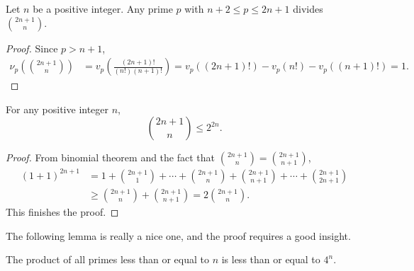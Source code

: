 \documentclass{subfile}
\begin{document}
	\begin{lemma}\label{lem:bertrand4}
		Let $n$ be a positive integer. Any prime $p$ with $n+2\leq p\leq 2n+1$ divides $\binom{2n+1}{n}$.
	\end{lemma}

	\begin{proof}
		Since $p>n+1$,
		\begin{align*}
			\nu_p\left(\binom{2n+1}{n}\right)  & =  v_p \left(\frac{(2n+1)!}{(n!)(n+1)!}\right) = v_p((2n+1)!)-v_p(n!)-v_p((n+1)!)=1.
		\end{align*}
	\end{proof}

	\begin{lemma}\label{lem:bertrand5}
		For any positive integer $n$,
		\[\binom{2n+1}{n}\leq2^{2n}.\]
	\end{lemma}

	\begin{proof}
		From binomial theorem and the fact that $\binom{2n+1}{n}=\binom{2n+1}{n+1}$,
		\begin{align*}
			(1+1)^{2n+1}  & =     1+\binom{2n+1}1+\cdots+\binom{2n+1}{n}+\binom{2n+1}{n+1}+\cdots+\binom{2n+1}{2n+1}\\
			& \geq  \binom{2n+1}{n}+\binom{2n+1}{n+1} =  2\binom{2n+1}{n}.
		\end{align*}
		This finishes the proof.
	\end{proof}

	The following lemma is really a nice one, and the proof requires a good insight.

	\begin{lemma}\label{lem:bertrand6}
		The product of all primes less than or equal to $n$ is less than or equal to $4^n$.
	\end{lemma}
\end{document}
